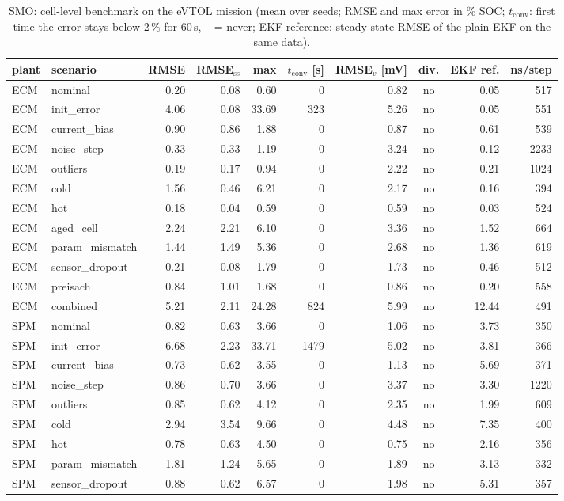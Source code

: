 \begin{table}[H]\centering\footnotesize\setlength{\tabcolsep}{4pt}
\caption{SMO: cell-level benchmark on the eVTOL mission (mean over seeds; RMSE and max error in \% SOC; $t_\mathrm{conv}$: first time the error stays below 2\,\% for 60\,s, -- = never; EKF reference: steady-state RMSE of the plain EKF on the same data).}\label{tab:cell_SMO}
\begin{tabular}{llrrrrrcrr}\toprule
plant & scenario & RMSE & RMSE$_\mathrm{ss}$ & max & $t_\mathrm{conv}$ [s] & RMSE$_v$ [mV] & div. & EKF ref. & ns/step \\ \midrule
ECM & nominal & 0.20 & 0.08 & 0.60 & 0 & 0.82 & no & 0.05 & 517 \\
ECM & init\_error & 4.06 & 0.08 & 33.69 & 323 & 5.26 & no & 0.05 & 551 \\
ECM & current\_bias & 0.90 & 0.86 & 1.88 & 0 & 0.87 & no & 0.61 & 539 \\
ECM & noise\_step & 0.33 & 0.33 & 1.19 & 0 & 3.24 & no & 0.12 & 2233 \\
ECM & outliers & 0.19 & 0.17 & 0.94 & 0 & 2.22 & no & 0.21 & 1024 \\
ECM & cold & 1.56 & 0.46 & 6.21 & 0 & 2.17 & no & 0.16 & 394 \\
ECM & hot & 0.18 & 0.04 & 0.59 & 0 & 0.59 & no & 0.03 & 524 \\
ECM & aged\_cell & 2.24 & 2.21 & 6.10 & 0 & 3.36 & no & 1.52 & 664 \\
ECM & param\_mismatch & 1.44 & 1.49 & 5.36 & 0 & 2.68 & no & 1.36 & 619 \\
ECM & sensor\_dropout & 0.21 & 0.08 & 1.79 & 0 & 1.73 & no & 0.46 & 512 \\
ECM & preisach & 0.84 & 1.01 & 1.68 & 0 & 0.86 & no & 0.20 & 558 \\
ECM & combined & 5.21 & 2.11 & 24.28 & 824 & 5.99 & no & 12.44 & 491 \\
\midrule
SPM & nominal & 0.82 & 0.63 & 3.66 & 0 & 1.06 & no & 3.73 & 350 \\
SPM & init\_error & 6.68 & 2.23 & 33.71 & 1479 & 5.02 & no & 3.81 & 366 \\
SPM & current\_bias & 0.73 & 0.62 & 3.55 & 0 & 1.13 & no & 5.69 & 371 \\
SPM & noise\_step & 0.86 & 0.70 & 3.66 & 0 & 3.37 & no & 3.30 & 1220 \\
SPM & outliers & 0.85 & 0.62 & 4.12 & 0 & 2.35 & no & 1.99 & 609 \\
SPM & cold & 2.94 & 3.54 & 9.66 & 0 & 4.48 & no & 7.35 & 400 \\
SPM & hot & 0.78 & 0.63 & 4.50 & 0 & 0.75 & no & 2.16 & 356 \\
SPM & param\_mismatch & 1.81 & 1.24 & 5.65 & 0 & 1.89 & no & 3.13 & 332 \\
SPM & sensor\_dropout & 0.88 & 0.62 & 6.57 & 0 & 1.98 & no & 5.31 & 357 \\
\bottomrule\end{tabular}\end{table}
